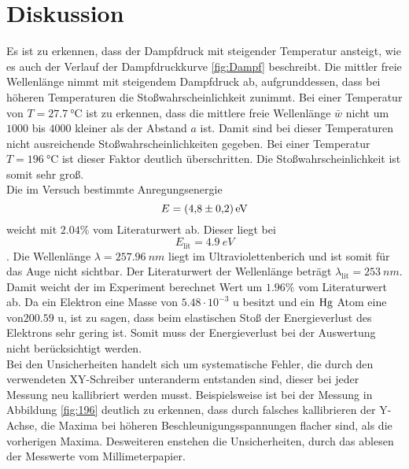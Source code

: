 \section{Diskussion}
\label{sec:Diskussion}

Es ist zu erkennen, dass der Dampfdruck mit steigender Temperatur ansteigt, wie es auch der Verlauf der Dampfdruckkurve \ref{fig:Dampf} beschreibt.
Die mittler freie Wellenlänge nimmt mit steigendem Dampfdruck ab, aufgrunddessen, dass bei höheren Temperaturen
die Stoßwahrscheinlichkeit zunimmt.
Bei einer Temperatur von $T = \qty{27.7}{\degreeCelsius}$ ist zu erkennen, dass die mittlere freie Wellenlänge $\bar{w}$
nicht um $1000$ bis $4000$ kleiner als der Abstand $a$ ist.
Damit sind bei dieser Temperaturen nicht ausreichende Stoßwahrscheinlichkeiten gegeben.
Bei einer Temperatur $T = \qty{196}{\degreeCelsius}$ ist dieser Faktor deutlich überschritten.
Die Stoßwahrscheinlichkeit ist somit sehr groß.\\


\noindent Die im Versuch bestimmte Anregungsenergie 
\begin{equation*}
    E = \qty{4.8 \pm 0.2}{eV}
\end{equation*}
weicht mit $2.04 \%$ vom Literaturwert ab.
Dieser liegt bei 
\begin{equation*}
    E_\text{lit} = \qty{4.9}{eV}
\end{equation*}
\cite{EAnregung}.
Die Wellenlänge $\lambda = \qty{257.96}{nm}$ liegt im Ultraviolettenberich und ist somit für das Auge nicht sichtbar.
Der Literaturwert der Wellenlänge beträgt $\lambda_\text{lit} = \qty{253}{nm}$.
Damit weicht der im Experiment berechnet Wert um $1.96 \%$ vom Literaturwert ab.
Da ein Elektron eine Masse von $5.48 \cdot 10^{-3}$ u besitzt und ein $\ce{Hg}$ Atom eine von$200.59$ u,
ist zu sagen, dass beim elastischen Stoß der Energieverlust des Elektrons sehr gering ist.
Somit muss der Energieverlust bei der Auswertung nicht berücksichtigt werden.\\

\noindent Bei den Unsicherheiten handelt sich um systematische Fehler, die durch den verwendeten XY-Schreiber unteranderm
entstanden sind, dieser bei jeder Messung neu kallibriert werden musst.
Beispielsweise ist bei der Messung in Abbildung \ref{fig:196} deutlich zu erkennen, dass durch falsches kallibrieren der Y-Achse,
die Maxima bei höheren Beschleunigungsspannungen flacher sind, als die vorherigen Maxima.
Desweiteren enstehen die Unsicherheiten, durch das ablesen der Messwerte vom Millimeterpapier.




